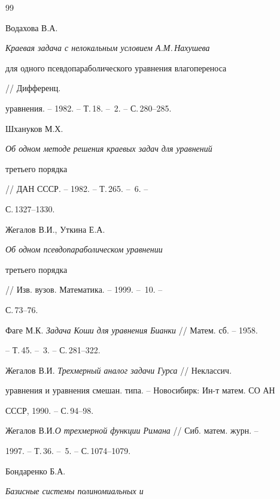\begin{thebibliography}{99}
 




Водахова В.А. {\em Краевая задача с нелокальным условием А.М.\,Нахушева 


для одного псевдопараболического уравнения влагопереноса} // Дифференц. 


уравнения. -- 1982. -- Т.\,18. -- \No\,2. -- С.\,280--285. 


 




Шхануков М.Х. {\em Об одном методе решения краевых задач для уравнений 


третьего порядка} // ДАН СССР. -- 1982. -- Т.\,265. -- \No\,6. -- 


С.\,1327--1330. 


 




Жегалов В.И., Уткина Е.А. {\em Об одном псевдопараболическом уравнении 


третьего порядка} // Изв. вузов. Математика. -- 1999. -- \No\,10. -- 


С.\,73--76. 


 




Фаге М.К. {\em Задача Коши для уравнения Бианки} // Матем. сб. -- 1958. 


-- Т.\,45. -- \No\,3. -- С.\,281--322. 


 




Жегалов В.И. {\em Трехмерный аналог задачи Гурса} // Неклассич. 


уравнения и уравнения смешан. типа. -- Новосибирк: Ин-т матем. СО АН 


СССР, 1990. -- С.\,94--98. 


 




Жегалов В.И.{\em О трехмерной функции Римана} // Сиб. матем. журн. -- 


1997. -- Т.\,36. -- \No\,5. -- С.\,1074--1079. 


 




Бондаренко Б.А. {\em Базисные системы полиномиальных и 


}
\end{thebibliography}
